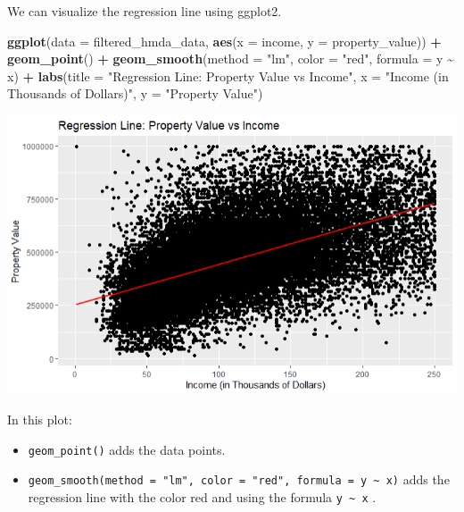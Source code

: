 \documentclass[
]{book}
\newenvironment{Shaded}{\begin{snugshade}}{\end{snugshade}}
\newcommand{\AttributeTok}[1]{\textcolor[rgb]{0.13,0.29,0.53}{#1}}
\newcommand{\FunctionTok}[1]{\textcolor[rgb]{0.13,0.29,0.53}{\textbf{#1}}}
\newcommand{\NormalTok}[1]{#1}
\newcommand{\SpecialCharTok}[1]{\textcolor[rgb]{0.81,0.36,0.00}{\textbf{#1}}}
\newcommand{\StringTok}[1]{\textcolor[rgb]{0.31,0.60,0.02}{#1}}
\begin{document}
We can visualize the regression line using ggplot2.

\begin{Shaded}
\begin{Highlighting}[]
\FunctionTok{ggplot}\NormalTok{(}\AttributeTok{data =}\NormalTok{ filtered\_hmda\_data, }\FunctionTok{aes}\NormalTok{(}\AttributeTok{x =}\NormalTok{ income, }\AttributeTok{y =}\NormalTok{ property\_value)) }\SpecialCharTok{+}
  \FunctionTok{geom\_point}\NormalTok{() }\SpecialCharTok{+}
  \FunctionTok{geom\_smooth}\NormalTok{(}\AttributeTok{method =} \StringTok{"lm"}\NormalTok{, }\AttributeTok{color =} \StringTok{"red"}\NormalTok{, }\AttributeTok{formula =}\NormalTok{ y }\SpecialCharTok{\textasciitilde{}}\NormalTok{ x) }\SpecialCharTok{+}
  \FunctionTok{labs}\NormalTok{(}\AttributeTok{title =} \StringTok{"Regression Line: Property Value vs Income"}\NormalTok{,}
       \AttributeTok{x =} \StringTok{"Income (in Thousands of Dollars)"}\NormalTok{,}
       \AttributeTok{y =} \StringTok{"Property Value"}\NormalTok{)}
\end{Highlighting}
\end{Shaded}

\includegraphics{images/scatter_plot_with_regression.PNG}

In this plot:

\begin{itemize}
\item
  \texttt{geom\_point()} adds the data points.
\item
  \texttt{geom\_smooth(method\ =\ "lm",\ color\ =\ "red",\ formula\ =\ y\ \textasciitilde{}\ x)} adds the regression line with the color red and using the formula \texttt{y\ \textasciitilde{}\ x} .
\end{itemize}
\end{document}
